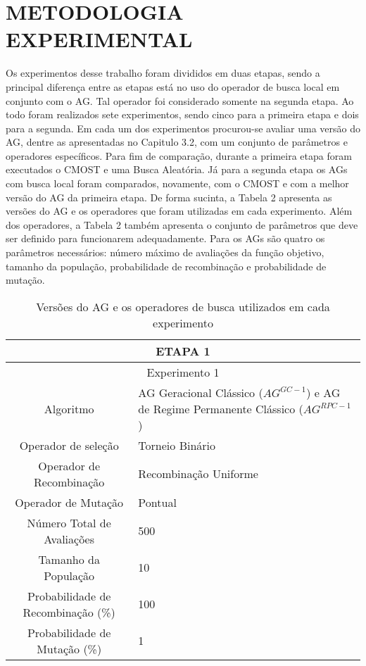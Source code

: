 \section{METODOLOGIA EXPERIMENTAL}

Os experimentos desse trabalho foram divididos em duas etapas, sendo a principal diferença entre as etapas está no uso do operador de busca local em conjunto com o AG. Tal operador foi considerado somente na segunda etapa. Ao todo foram realizados sete experimentos, sendo cinco para a primeira etapa e dois para a segunda. Em cada um dos experimentos procurou-se avaliar uma versão do AG, dentre as apresentadas no Capitulo 3.2, com um conjunto de parâmetros e operadores específicos. Para fim de comparação, durante a primeira etapa foram executados o CMOST e uma Busca Aleatória. Já para a segunda etapa os AGs com busca local foram comparados, novamente, com o CMOST e com a melhor versão do AG da primeira etapa. De forma sucinta, a Tabela 2 apresenta as versões do AG e os operadores que foram utilizadas em cada experimento. Além dos operadores, a Tabela 2 também apresenta o conjunto de parâmetros que deve ser definido para funcionarem adequadamente. Para os AGs são quatro os parâmetros necessários: número máximo de avaliações da função objetivo, tamanho da população, probabilidade de recombinação e probabilidade de mutação.

\begin{table}[H]
\centering
\caption{Versões do AG e os operadores de busca utilizados em cada experimento}

\begin{tabular}{|c|p{10cm}|}
\hline
 \multicolumn{2}{|c|}{ETAPA 1} \\ \hline
 \multicolumn{2}{|c|}{Experimento 1} \\ \hline
 {Algoritmo} & AG Geracional Clássico ($AG^{GC-1}$) e AG de Regime Permanente Clássico ($AG^{RPC-1}$) \\ \hline
 Operador de seleção & Torneio Binário \\ \hline
 Operador de Recombinação & Recombinação Uniforme \\  \hline
 Operador de Mutação & Pontual \\ \hline
 Número Total de Avaliações & 500 \\ \hline
 Tamanho da População & 10 \\ \hline
 Probabilidade de Recombinação (\%) & 100 \\ \hline
 Probabilidade de Mutação (\%) & 1 \\ \hline 
\end{tabular}
\end{table}



